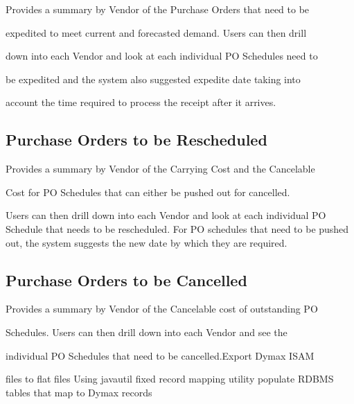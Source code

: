 \documentclass[letterpaper,10pt,english]{sphinxmanual}
\begin{document}
\begin{DUlineblock}{0em}
\item[] Provides a summary by Vendor of the Purchase Orders that need to be
\item[] expedited to meet current and forecasted demand. Users can then drill
\item[] down into each Vendor and look at each individual PO Schedules need to
\item[] be expedited and the system also suggested expedite date taking into
\item[] account the time required to process the receipt after it arrives.
\end{DUlineblock}


\subsection{Purchase Orders to be Rescheduled}
\label{APS/APS-Features-and-Benefits:purchase-orders-to-be-rescheduled}
\begin{DUlineblock}{0em}
\item[] Provides a summary by Vendor of the Carrying Cost and the Cancelable
\item[] Cost for PO Schedules that can either be pushed out for cancelled.
\end{DUlineblock}

Users
\textbar{} can then drill down into each Vendor and look at each individual PO
\textbar{} Schedule that needs to be rescheduled. For PO schedules that need to
be
\textbar{} pushed out, the system suggests the new date by which they are
required.


\subsection{Purchase Orders to be Cancelled}
\label{APS/APS-Features-and-Benefits:purchase-orders-to-be-cancelled}
\begin{DUlineblock}{0em}
\item[] Provides a summary by Vendor of the Cancelable cost of outstanding PO
\item[] Schedules. Users can then drill down into each Vendor and see the
\item[] individual PO Schedules that need to be cancelled.Export Dymax ISAM
\end{DUlineblock}

files to flat files
\textbar{} Using javautil fixed record mapping utility populate RDBMS tables that
map to Dymax records
\end{document}
